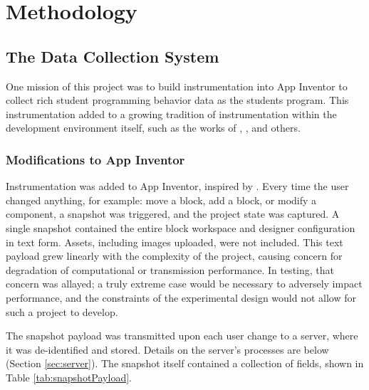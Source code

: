 \chapter{Methodology}

\section{The Data Collection System}
One mission of this project was to build instrumentation into App Inventor to collect rich student programming behavior data as the students program. This instrumentation added to a growing tradition of instrumentation within the development environment itself, such as the works of \citet{berland-2013}, \citet{lipman-phd}, and others.

\subsection{Modifications to App Inventor}
\label{sec:mod-ai}
Instrumentation was added to App Inventor, inspired by \citet{piech-2012}. Every time the user changed anything, for example: move a block, add a block, or modify a component, a snapshot was triggered, and the project state was captured. A single snapshot contained the entire block workspace and designer configuration in text form. Assets, including images uploaded, were not included. This text payload grew linearly with the complexity of the project, causing concern for degradation of computational or transmission performance. In testing, that concern was allayed; a truly extreme case would be necessary to adversely impact performance, and the constraints of the experimental design would not allow for such a project to develop.

The snapshot payload was transmitted upon each user change to a server, where it was de-identified and stored. Details on the server's processes are below (Section \ref{sec:server}). The snapshot itself contained a collection of fields, shown in Table \ref{tab:snapshotPayload}. 


